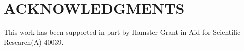 \documentclass[letterpaper, 10 pt, conference]{IEEEtran}  %
\begin{document}
\section*{ACKNOWLEDGMENTS}
This work has been supported in part by Hamster Grant-in-Aid for Scientific Research(A) 40039.






%

\end{document}
